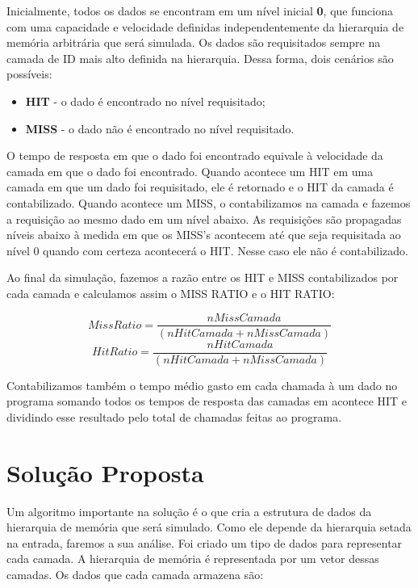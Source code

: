\documentclass[12pt]{article}
\begin{document}
Inicialmente, todos os dados se encontram em um nível inicial \textbf{0}, que funciona com uma capacidade e velocidade definidas independentemente da hierarquia de memória arbitrária que será simulada. Os dados são requisitados sempre na camada de ID mais alto definida na hierarquia. Dessa forma, dois cenários são possíveis:

\begin{itemize}
  \item \textbf{HIT} - o dado é encontrado no nível requisitado;
  \item \textbf{MISS} - o dado não é encontrado no nível requisitado.
\end{itemize}

O tempo de resposta em que o dado foi encontrado equivale à velocidade da camada em que o dado foi encontrado. Quando acontece um HIT em uma camada em que um dado foi requisitado, ele é retornado e o HIT da camada é contabilizado. Quando acontece um MISS, o contabilizamos na camada e fazemos a requisição ao mesmo dado em um nível abaixo. As requisições são propagadas níveis abaixo à medida em que os MISS's acontecem até que seja requisitada ao nível 0 quando com certeza acontecerá o HIT. Nesse caso ele não é contabilizado.

Ao final da simulação, fazemos a razão entre os HIT e MISS contabilizados por cada camada e calculamos assim o MISS RATIO 
e o HIT RATIO:
\begin{center}
\[MissRatio = \frac{nMissCamada}{(nHitCamada + nMissCamada)}\]
\[HitRatio = \frac{nHitCamada}{(nHitCamada + nMissCamada)}\]
\end{center}

Contabilizamos também o tempo médio gasto em cada chamada à um dado no programa somando todos os tempos de resposta das camadas em acontece HIT e dividindo esse resultado pelo total de chamadas feitas ao programa.

\section{Solução Proposta}
\label{solucao_proposta}

Um algoritmo importante na solução é o que cria a estrutura de dados da hierarquia de memória que será simulado. Como ele depende da hierarquia setada na entrada, faremos a sua análise. Foi criado um tipo de dados para representar cada camada. A hierarquia de memória é representada por um vetor dessas camadas. Os dados que cada camada armazena são:
\end{document}
